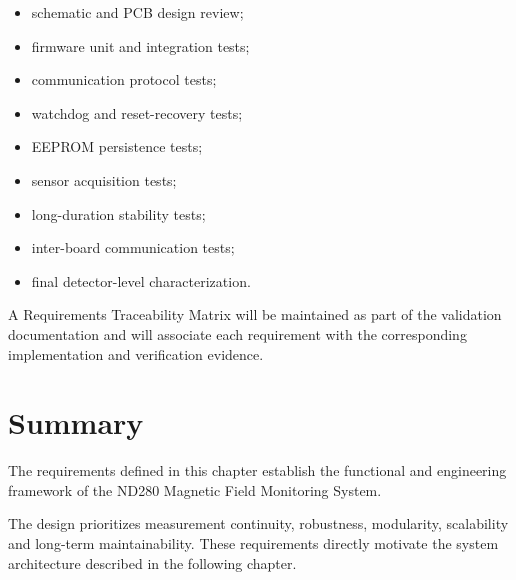 \begin{itemize}[leftmargin=*]
	
	\item schematic and PCB design review;
	
	\item firmware unit and integration tests;
	
	\item communication protocol tests;
	
	\item watchdog and reset-recovery tests;
	
	\item EEPROM persistence tests;
	
	\item sensor acquisition tests;
	
	\item long-duration stability tests;
	
	\item inter-board communication tests;
	
	\item final detector-level characterization.
	
\end{itemize}

A Requirements Traceability Matrix will be maintained as part of the validation documentation and will associate each requirement with the corresponding implementation and verification evidence.

\section{Summary}

The requirements defined in this chapter establish the functional and engineering framework of the ND280 Magnetic Field Monitoring System.

The design prioritizes measurement continuity, robustness, modularity, scalability and long-term maintainability. These requirements directly motivate the system architecture described in the following chapter.